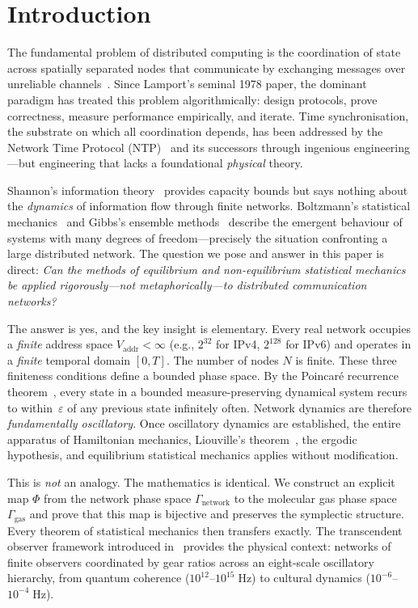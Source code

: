 \documentclass[11pt,twocolumn,a4paper]{article}
\theoremstyle{definition}
\theoremstyle{remark}
\newcommand{\Vaddr}{V_{\mathrm{addr}}}
\begin{document}
\section{Introduction}\label{sec:intro}

The fundamental problem of distributed computing is the coordination of state
across spatially separated nodes that communicate by exchanging messages over
unreliable channels~\cite{Lamport1978}.  Since Lamport's seminal 1978 paper,
the dominant paradigm has treated this problem algorithmically: design
protocols, prove correctness, measure performance empirically, and iterate.
Time synchronisation, the substrate on which all coordination depends, has
been addressed by the Network Time Protocol (NTP)~\cite{Mills1991} and its
successors through ingenious engineering---but engineering that lacks a
foundational \emph{physical} theory.

Shannon's information theory~\cite{Shannon1948} provides capacity bounds but
says nothing about the \emph{dynamics} of information flow through finite
networks.  Boltzmann's statistical mechanics~\cite{Boltzmann1877} and Gibbs's
ensemble methods~\cite{Gibbs1902} describe the emergent behaviour of systems
with many degrees of freedom---precisely the situation confronting a large
distributed network.  The question we pose and answer in this paper is
direct: \emph{Can the methods of equilibrium and non-equilibrium statistical
mechanics be applied rigorously---not metaphorically---to distributed
communication networks?}

The answer is yes, and the key insight is elementary.  Every real network
occupies a \emph{finite} address space $\Vaddr < \infty$ (e.g.,
$2^{32}$ for IPv4, $2^{128}$ for IPv6) and operates in a \emph{finite}
temporal domain $[0,T]$.  The number of nodes $N$ is finite.  These three
finiteness conditions define a bounded phase space.  By the Poincar\'e
recurrence theorem~\cite{Poincare1890}, every state in a bounded
measure-preserving dynamical system recurs to within~$\varepsilon$ of any
previous state infinitely often.  Network dynamics are therefore
\emph{fundamentally oscillatory}.  Once oscillatory dynamics are established,
the entire apparatus of Hamiltonian mechanics, Liouville's
theorem~\cite{Liouville1838}, the ergodic hypothesis, and equilibrium
statistical mechanics applies without modification.

This is \emph{not} an analogy.  The mathematics is identical.  We construct an
explicit map $\Phi$ from the network phase space $\Gamma_{\mathrm{network}}$
to the molecular gas phase space $\Gamma_{\mathrm{gas}}$ and prove that this
map is bijective and preserves the symplectic structure.  Every theorem of
statistical mechanics then transfers exactly.  The transcendent observer
framework introduced in~\cite{Sachikonye2024a,Sachikonye2024b} provides the
physical context: networks of finite observers coordinated by gear ratios
across an eight-scale oscillatory hierarchy, from quantum coherence
($10^{12}$--$10^{15}\;\mathrm{Hz}$) to cultural dynamics
($10^{-6}$--$10^{-4}\;\mathrm{Hz}$).
\end{document}

